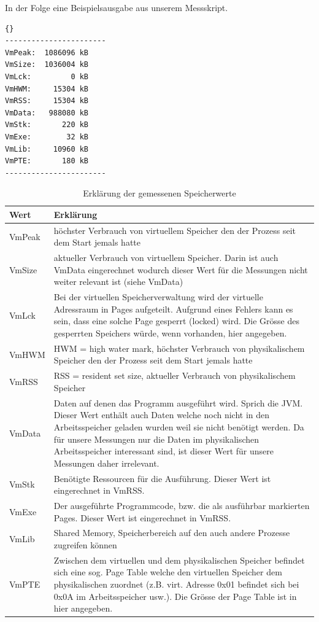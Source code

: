 \documentclass{fancydocument}
\begin{document}
\noindent
In der Folge eine Beispielsausgabe aus unserem Messskript.

\begin{minipage}{\textwidth}
\begin{lstlisting}[language=bash,caption=Speicherdaten]{}
-----------------------
VmPeak:	 1086096 kB
VmSize:	 1036004 kB
VmLck:	       0 kB
VmHWM:	   15304 kB
VmRSS:	   15304 kB
VmData:	  988080 kB
VmStk:	     220 kB
VmExe:	      32 kB
VmLib:	   10960 kB
VmPTE:	     180 kB
-----------------------
\end{lstlisting}
\end{minipage}

\begin{table}[ht!]
\begin{tabular}[c]{|l|p{13cm}|} \hline
\textbf{Wert} & \textbf{Erklärung}\\
\hline
VmPeak & höchster Verbrauch von virtuellem Speicher den der Prozess seit dem Start jemals hatte\\
\hline
VmSize & aktueller Verbrauch von virtuellem Speicher. Darin ist auch VmData eingerechnet wodurch dieser Wert für die Messungen nicht weiter relevant ist (siehe VmData)\\
\hline
VmLck & Bei der virtuellen Speicherverwaltung wird der virtuelle Adressraum in Pages aufgeteilt. Aufgrund eines Fehlers kann es sein, dass eine solche Page gesperrt (locked) wird. Die Grösse des gesperrten Speichers würde, wenn vorhanden, hier angegeben.\\
\hline
VmHWM & HWM = high water mark, höchster Verbrauch von physikalischem Speicher den der Prozess seit dem Start jemals hatte\\
\hline
VmRSS & RSS = resident set size, aktueller Verbrauch von physikalischem Speicher\\
\hline
VmData & Daten auf denen das Programm ausgeführt wird. Sprich die JVM. Dieser Wert enthält auch Daten welche noch nicht in den Arbeitsspeicher geladen wurden weil sie nicht benötigt werden. Da für unsere Messungen nur die Daten im physikalischen Arbeitsspeicher interessant sind, ist dieser Wert für unsere Messungen daher irrelevant.\\
\hline
VmStk & Benötigte Ressourcen für die Ausführung. Dieser Wert ist eingerechnet in VmRSS.\\
\hline
VmExe & Der ausgeführte Programmcode, bzw. die als ausführbar markierten Pages. Dieser Wert ist eingerechnet in VmRSS.\\
\hline
VmLib & Shared Memory, Speicherbereich auf den auch andere Prozesse zugreifen können\\
\hline
VmPTE & Zwischen dem virtuellen und dem physikalischen Speicher befindet sich eine sog. Page Table welche den virtuellen Speicher dem physikalischen zuordnet  (z.B. virt. Adresse 0x01 befindet sich bei 0x0A im Arbeitsspeicher usw.). Die Grösse der Page Table ist in hier angegeben. \\
\hline							
\end{tabular}
\caption{Erklärung der gemessenen Speicherwerte}
\end{table}
\end{document}
